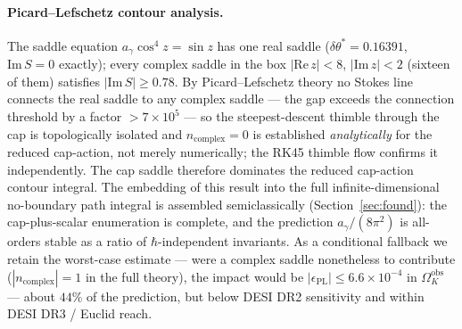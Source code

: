 \documentclass[11pt,a4paper]{article}
\theoremstyle{plain}
\theoremstyle{definition}
\theoremstyle{remark}
\newcommand{\Ok}{\Omega_K}
\newcommand{\ag}{a_\gamma}
\newcommand{\dtheta}{\delta\theta}
\begin{document}
\paragraph{Picard--Lefschetz contour analysis.}
The saddle equation $\ag\cos^4 z = \sin z$ has one real saddle ($\dtheta^* = 0.16391$,
$\mathrm{Im}\,S = 0$ exactly); every complex saddle in the box $|\mathrm{Re}\,z| < 8$,
$|\mathrm{Im}\,z| < 2$ (sixteen of them) satisfies $|\mathrm{Im}\,S| \ge 0.78$. By
Picard--Lefschetz theory no Stokes line connects the real saddle to any complex saddle --- the
gap exceeds the connection threshold by a factor $>7\times 10^5$ --- so the steepest-descent
thimble through the cap is topologically isolated and $n_{\mathrm{complex}} = 0$ is established
\emph{analytically} for the reduced cap-action, not merely numerically; the RK45 thimble flow
confirms it independently. The cap saddle therefore dominates the reduced cap-action contour
integral. The embedding of this result into the full infinite-dimensional no-boundary path
integral is assembled semiclassically (Section~\ref{sec:found}): the cap-plus-scalar enumeration
is complete, and the prediction $\ag/(8\pi^2)$ is all-orders stable as a ratio of
$\hbar$-independent invariants. As a conditional fallback we retain the worst-case estimate ---
were a complex saddle nonetheless to contribute ($|n_{\mathrm{complex}}| = 1$ in the full theory),
the impact would be $|\epsilon_{\mathrm{PL}}| \le 6.6\times10^{-4}$ in $\Ok^{\mathrm{obs}}$ ---
about $44\%$ of the prediction, but below DESI DR2 sensitivity and within DESI DR3 / Euclid reach.
\end{document}
